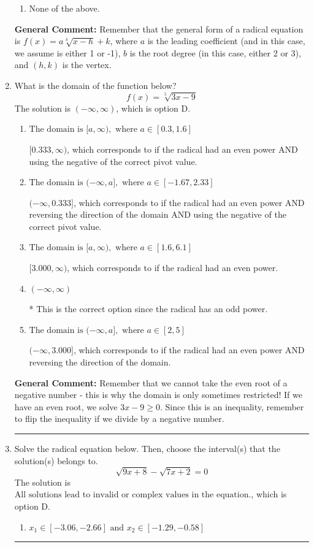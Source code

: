 \documentclass{extbook}[14pt]
\newcommand{\litem}[1]{\item #1

\rule{\textwidth}{0.4pt}}
\begin{document}
\begin{enumerate}
{\begin{enumerate}[label=\Alph*.]
\begin{multicols}{2}
\end{multicols}\item None of the above.\end{enumerate}
\textbf{General Comment:} Remember that the general form of a radical equation is $ f(x) = a \sqrt[b]{x - h} + k $, where $a$ is the leading coefficient (and in this case, we assume is either 1 or -1), $b$ is the root degree (in this case, either 2 or 3), and $(h, k)$ is the vertex.
}
\litem{
What is the domain of the function below?
\[ f(x) = \sqrt[5]{3 x - 9} \]The solution is \( (-\infty, \infty) \), which is option D.\begin{enumerate}[label=\Alph*.]
\item \( \text{The domain is } [a, \infty), \text{   where } a \in [0.3, 1.6] \)

$[0.333, \infty)$, which corresponds to if the radical had an even power AND using the negative of the correct pivot value.
\item \( \text{The domain is } (-\infty, a], \text{   where } a \in [-1.67, 2.33] \)

$(-\infty, 0.333]$, which corresponds to if the radical had an even power AND reversing the direction of the domain AND using the negative of the correct pivot value.
\item \( \text{The domain is } [a, \infty), \text{   where } a \in [1.6, 6.1] \)

$[3.000, \infty)$, which corresponds to if the radical had an even power.
\item \( (-\infty, \infty) \)

* This is the correct option since the radical has an odd power.
\item \( \text{The domain is } (-\infty, a], \text{   where } a \in [2, 5] \)

$(-\infty, 3.000]$, which corresponds to if the radical had an even power AND reversing the direction of the domain.
\end{enumerate}

\textbf{General Comment:} Remember that we cannot take the even root of a negative number - this is why the domain is only sometimes restricted! If we have an even root, we solve $3 x - 9 \geq 0$. Since this is an inequality, remember to flip the inequality if we divide by a negative number.
}
\litem{
Solve the radical equation below. Then, choose the interval(s) that the solution(s) belongs to.
\[ \sqrt{9 x + 8} - \sqrt{7 x + 2} = 0 \]The solution is \( \text{All solutions lead to invalid or complex values in the equation.} \), which is option D.\begin{enumerate}[label=\Alph*.]
\item \( x_1 \in [-3.06, -2.66] \text{ and } x_2 \in [-1.29,-0.58] \)


\end{enumerate}}
\end{enumerate}
\end{document}
